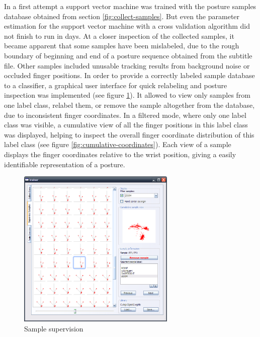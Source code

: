 In a first attempt a support vector machine was trained with the posture samples database obtained from section \ref{fig:collect-samples}. But even the parameter estimation for the support vector machine with a cross validation algorithm did not finish to run in days. At a closer inspection of the collected samples, it became apparent that some samples have been mislabeled, due to the rough boundary of beginning and end of a posture sequence obtained from the subtitle file. Other samples included unusable tracking results from background noise or occluded finger positions. In order to provide a correctly labeled sample database to a classifier, a graphical user interface for quick relabeling and posture inspection was implemented (see figure \ref{fig:sample-supervision}). It allowed to view only samples from one label class, relabel them, or remove the sample altogether from the database, due to inconsistent finger coordinates. In a filtered mode, where only one label class was visible, a cumulative view of all the finger positions in this label class was displayed, helping to inspect the overall finger coordinate distribution of this label class (see figure \ref{fig:cumulative-coordinates}). Each view of a sample displays the finger coordinates relative to the wrist position, giving a easily identifiable representation of a posture.

\begin{figure}[H]
\center
\includegraphics[width=0.67\textwidth]{images/sample-supervision} 
\caption{Sample supervision}
\label{fig:sample-supervision}
\end{figure}

